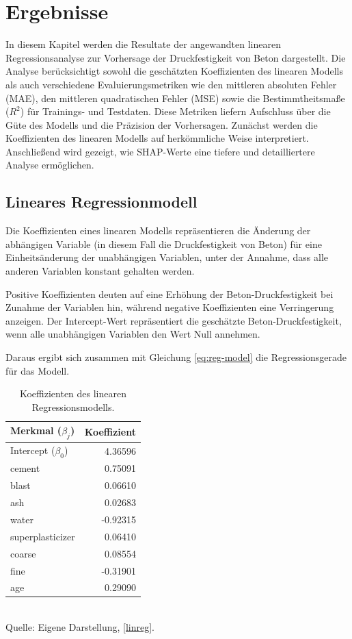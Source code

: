 \chapter{Ergebnisse}
\label{chapter:results}

In diesem Kapitel werden die Resultate der angewandten linearen Regressionsanalyse 
zur Vorhersage der Druckfestigkeit von Beton dargestellt. 
Die Analyse berücksichtigt sowohl die geschätzten Koeffizienten des linearen Modells 
als auch verschiedene Evaluierungsmetriken wie den mittleren absoluten Fehler (MAE), 
den mittleren quadratischen Fehler (MSE) sowie die Bestimmtheitsmaße ($R^2$) 
für Trainings- und Testdaten. Diese Metriken liefern Aufschluss über die Güte des Modells 
und die Präzision der Vorhersagen. Zunächst werden die Koeffizienten 
des linearen Modells auf herkömmliche Weise interpretiert. Anschließend wird gezeigt, 
wie SHAP-Werte eine tiefere und detailliertere Analyse ermöglichen.

\section{Lineares Regressionmodell}

Die Koeffizienten eines linearen Modells repräsentieren die Änderung der abhängigen 
Variable (in diesem Fall die Druckfestigkeit von Beton) 
für eine Einheitsänderung der unabhängigen Variablen, unter der Annahme, 
dass alle anderen Variablen konstant gehalten werden.

Positive Koeffizienten deuten auf eine Erhöhung der Beton-Druckfestigkeit 
bei Zunahme der Variablen hin, während negative Koeffizienten eine Verringerung anzeigen. 
Der Intercept-Wert repräsentiert die geschätzte Beton-Druckfestigkeit, 
wenn alle unabhängigen Variablen den Wert Null annehmen. 

Daraus ergibt sich zusammen mit Gleichung \ref{eq:reg-model} die Regressionsgerade für das Modell.

\begin{table}[!h]
    \caption{Koeffizienten des linearen Regressionsmodells.}
    \begin{tabularx}{\textwidth}{Xr}
    \toprule
    Merkmal ($\beta_j$) & Koeffizient \\
    \midrule
    Intercept ($\beta_0$) & 4.36596 \\
    cement & 0.75091 \\
    blast & 0.06610 \\
    ash & 0.02683 \\
    water & -0.92315 \\
    superplasticizer & 0.06410 \\
    coarse & 0.08554 \\
    fine &  -0.31901 \\
    age & 0.29090 \\
    \bottomrule
    \end{tabularx}
    \label{tab:model-coefficients}
    \\ Quelle: Eigene Darstellung, \ref{linreg}.
\end{table}


